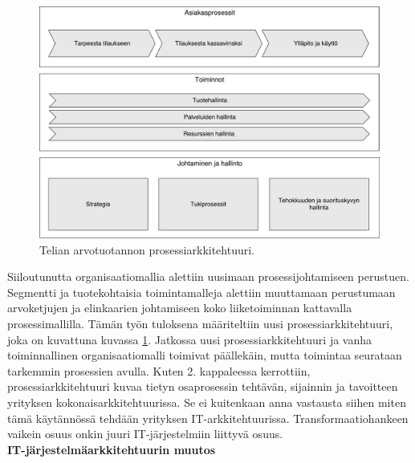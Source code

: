 \documentclass[finnish,12pt,a4paper,pdftex]{article}
\begin{document}

\begin{figure}[!h]
    \centering
    \includegraphics[scale=0.4]{images/prosessiarkkitehtuuri.pdf}
    \caption{Telian arvotuotannon prosessiarkkitehtuuri.}
    \label{fig:prosark}
\end{figure}

Siiloutunutta organisaatiomallia alettiin uusimaan prosessijohtamiseen perustuen. Segmentti ja tuotekohtaisia toimintamalleja alettiin muuttamaan perustumaan arvoketjujen ja elinkaarien johtamiseen koko liiketoiminnan kattavalla prosessimallilla. Tämän työn tuloksena määriteltiin uusi prosessiarkkitehtuuri, joka on kuvattuna kuvassa \ref{fig:prosark}. Jatkossa uusi prosessiarkkitehtuuri ja vanha toiminnallinen organisaatiomalli toimivat päällekäin, mutta toimintaa seurataan tarkemmin prosessien avulla. Kuten 2. kappaleessa kerrottiin, prosessiarkkitehtuuri kuvaa tietyn osaprosessin tehtävän, sijainnin ja tavoitteen yrityksen kokonaisarkkitehtuurissa. Se ei kuitenkaan anna vastausta siihen miten tämä käytännössä tehdään yrityksen IT-arkkitehtuurissa. Transformaatiohankeen vaikein osuus onkin juuri IT-järjestelmiin liittyvä osuus.\\

\textbf{IT-järjestelmäarkkitehtuurin muutos}\\
\end{document}
